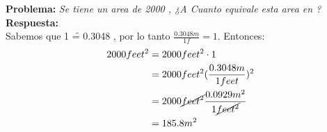 \begin{example}
\begin{tcolorbox}[colback=green!5!white,colframe=green!75!black,boxrule=0.5pt,arc=4pt,left=6pt,right=6pt,top=6pt,bottom=6pt,boxsep=0pt]
\textbf{Problema:} \textit{Se tiene un area de 2000 \ff, ¿A Cuanto equivale esta area en \mc? }\\
\textbf{Respuesta:}\\ 
Sabemos que 1 \f = 0.3048 \m, por lo tanto $\frac{0.3048 m}{1 f} = 1$. Entonces:\\
\begin{align}
2000 feet^{2} & = 2000 feet^2 \cdot 1 \\
       & = 2000 feet^2 (\frac{0.3048 m}{1 feet})^2\\
       & = 2000 \cancel{feet^2} \frac{0.0929 m^2}{1 \cancel{feet^2}}\\
       & = 185.8 m^2
\end{align}
\end{tcolorbox}
\end{example}  






